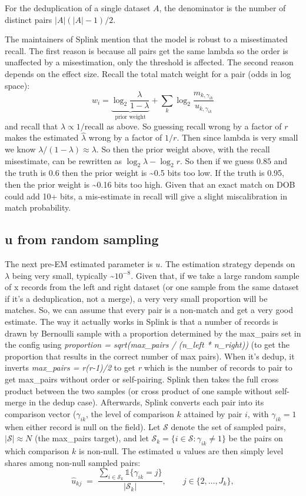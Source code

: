 \documentclass[11pt]{article}
\begin{document}
For the deduplication of a single dataset $A$, the denominator is the number of distinct pairs $|A|(|A|-1)/2$.

The maintainers of Splink mention that the model is robust to a misestimated recall. The first reason is because all pairs get the same lambda so the order is unaffected by a misestimation, only the threshold is affected. The second reason depends on the effect size. Recall the total match weight for a pair (odds in log space):
\[
w_i = \underbrace{\log_2 \frac{\lambda}{1-\lambda}}_{\text{prior weight}} + \sum_k \log_2 \frac{m_{k,\gamma_{ik}}}{u_{k,\gamma_{ik}}}
\]
and recall that $\lambda \propto 1 / \text{recall}$ as above. So guessing recall wrong by a factor of $r$ makes the estimated $\hat\lambda$ wrong by a factor of $1/r$. Then since lambda is very small we know $\lambda / (1-\lambda) \approx \lambda$. So then the prior weight above, with the recall misestimate, can be rewritten as $\log_2 \lambda - \log_2 r$. So then if we guess $0.85$ and the truth is 0.6 then the prior weight is \textasciitilde{}0.5 bits too low. If the truth is 0.95, then the prior weight is \textasciitilde{}0.16 bits too high. Given that an exact match on DOB could add 10+ bits, a mis-estimate in recall will give a slight miscalibration in match probability.

\subsection{u from random sampling}

The next pre-EM estimated parameter is $u$. The estimation strategy depends on $\lambda$ being very small, typically \textasciitilde{}$10^{-8}$. Given that, if we take a large random sample of x records from the left and right dataset (or one sample from the same dataset if it's a deduplication, not a merge), a very very small proportion will be matches. So, we can assume that every pair is a non-match and get a very good estimate. The way it actually works in Splink is that a number of records is drawn by Bernoulli sample with a proportion determined by the max\_pairs set in the config using \emph{proportion = sqrt(max\_pairs / (n\_left * n\_right))} (to get the proportion that results in the correct number of max pairs). When it's dedup, it inverts \emph{max\_pairs = r(r-1)/2} to get \emph{r} which is the number of records to pair to get max\_pairs without order or self-pairing. Splink then takes the full cross product between the two samples (or cross product of one sample without self-merge in the dedup case). Afterwards, Splink converts each pair into its comparison vector ($\gamma_{ik}$, the level of comparison $k$ attained by pair $i$, with $\gamma_{ik} = 1$ when either record is null on the field). Let $\mathcal{S}$ denote the set of sampled pairs, $|\mathcal{S}| \approx N$ (the max\_pairs target), and let $\mathcal{S}_k = \{ i \in \mathcal{S} : \gamma_{ik} \neq 1\}$ be the pairs on which comparison $k$ is non-null. The estimated $u$ values are then simply level shares among non-null sampled pairs:
\[
\hat{u}_{kj} \;=\; \frac{\displaystyle\sum_{i \in \mathcal{S}_k} \mathds{1}\{\gamma_{ik} = j\}}{|\mathcal{S}_k|},
\qquad j \in \{2, \dots, J_k\},
\]
\end{document}
